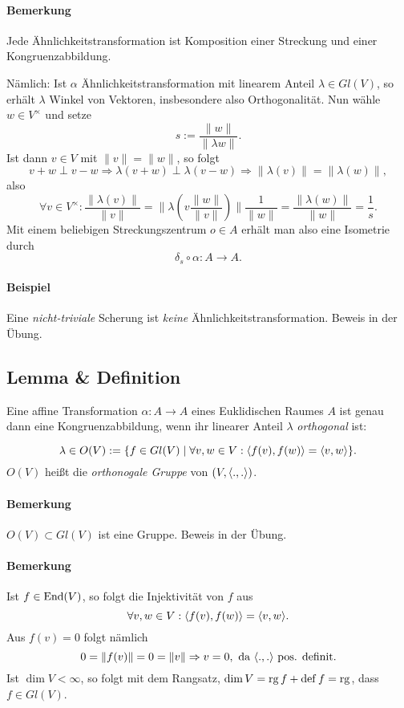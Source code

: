 \paragraph{Bemerkung}
	Jede Ähnlichkeitstransformation ist Komposition einer Streckung und einer Kongruenzabbildung.
	
	Nämlich: Ist $ \alpha $ Ähnlichkeitstransformation mit linearem Anteil $ \lambda\in Gl(V) $, so erhält $ \lambda $ Winkel von Vektoren, insbesondere also Orthogonalität.
	Nun wähle $ w\in V^\times $ und setze
		\[ s := \frac{\|w\|}{\|\lambda w\|}. \]
	Ist dann $ v\in V $ mit $ \|v\|=\|w\| $, so folgt
		\[ v+w \perp v-w \Rightarrow \lambda(v+w)\perp \lambda(v-w) \Rightarrow \|\lambda(v)\| = \|\lambda(w)\|, \]
	also 
		\[ \forall v\in V^\times: \frac{\|\lambda(v)\|}{\|v\|} = \|\lambda(v\frac{\|w\|}{\|v\|})\|\frac{1}{\|w\|} = \frac{\|\lambda (w)\|}{\|w\|} = \frac{1}{s}. \]
	Mit einem beliebigen Streckungszentrum $ o\in A $ erhält man also eine Isometrie durch
		\[ \delta_s\circ \alpha :A\to A. \]
\paragraph{Beispiel}
	Eine \emph{nicht-triviale} Scherung ist \emph{keine} Ähnlichkeitstransformation. Beweis in der Übung. %

\subsection{Lemma \& Definition}
\begin{Lemma}
	Eine affine Transformation $ \alpha:A\to A $ eines Euklidischen Raumes $ A $ ist genau dann eine Kongruenzabbildung, wenn ihr linearer Anteil $ \lambda $ \emph{orthogonal} ist:
\end{Lemma}
\begin{Definition}
		\[ \lambda\in O(V):= \{f\in Gl(V)\mid \forall v,w\in V: \langle f(v),f(w) \rangle = \langle v,w \rangle\}. \]
	$ O(V) $ heißt die \emph{orthonogale Gruppe} von $ (V,\langle .,. \rangle) $.
\end{Definition}

\paragraph{Bemerkung}
	$ O(V)\subset Gl(V) $ ist eine Gruppe. Beweis in der Übung.
\paragraph{Bemerkung}
	Ist $ f\in \operatorname{End}(V) $, so folgt die Injektivität von $ f $ aus
		\[ \forall v,w\in V: \langle f(v),f(w) \rangle = \langle v,w \rangle. \]
	Aus $ f(v) = 0 $ folgt nämlich
		\[ 0 = \|f(v)\| = 0 = \|v\| \Rightarrow v = 0, \text{ da } \langle .,. \rangle\text{ pos. definit.} \]
	Ist $ \dim V <\infty $, so folgt mit dem Rangsatz, $ \dim V = \operatorname{rg} f + \operatorname{def} f = \operatorname{rg} $, dass $ f\in Gl(V) $.
	
